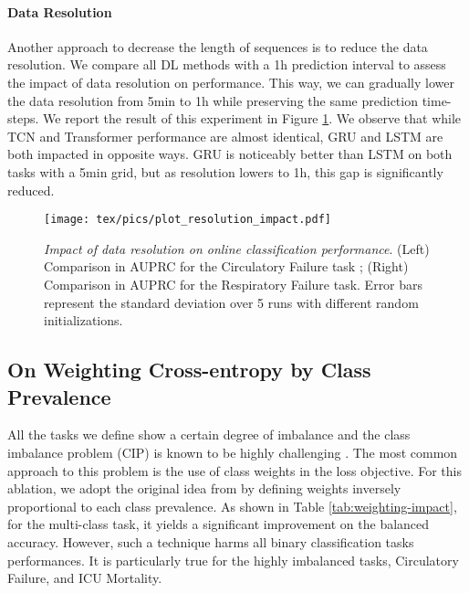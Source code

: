 \documentclass{article}
\begin{document}
\paragraph{Data Resolution} Another approach to decrease the length of sequences is to reduce the data resolution.  We compare all DL methods with a 1h prediction interval to assess the impact of data resolution on performance. This way, we can gradually lower the data resolution from 5min to 1h while preserving the same prediction time-steps. We report the result of this experiment in Figure \ref{fig:ablation-resolution}. We observe that while TCN and Transformer performance are almost identical, GRU and LSTM are both impacted in opposite ways. GRU is noticeably better than LSTM on both tasks with a 5min grid, but as resolution lowers to 1h, this gap is significantly reduced.
\begin{figure}[!ht]
    \centering
    \texttt{[image: tex/pics/plot\_resolution\_impact.pdf]}
    \caption{\textit{Impact of data resolution on online classification performance}. (Left) Comparison in AUPRC for the Circulatory Failure task ; (Right) Comparison in AUPRC for the Respiratory Failure task. Error bars represent the standard deviation over 5 runs with different random initializations.}
    \label{fig:ablation-resolution}
\end{figure}

\subsection{On Weighting Cross-entropy by Class Prevalence }\label{ablation:weight}
All the tasks we define show a certain degree of imbalance and the class imbalance problem (CIP) is known to be highly challenging \cite{johnson2019survey}. The most common approach to this problem is the use of class weights in the loss objective. For this ablation, we adopt the original idea from \citep{king2001logistic} by defining weights inversely proportional to each class prevalence. As shown in Table \ref{tab:weighting-impact}, for the multi-class task, it yields a significant improvement on the balanced accuracy. However, such a technique harms all binary classification tasks performances. It is particularly true for the highly imbalanced tasks, Circulatory Failure, and ICU Mortality.
\end{document}
